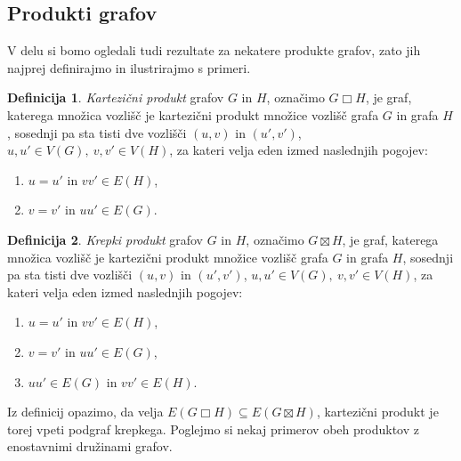 \documentclass[12pt,a4paper,twoside]{article}
\theoremstyle{definition} %
\newtheorem{definicija}{Definicija}[section]
\theoremstyle{plain} %
\numberwithin{equation}{section}  %
\DeclareMathOperator{\boxempty}{\Box}
\begin{document}
\subsection{Produkti grafov}
V delu si bomo ogledali tudi rezultate za nekatere produkte grafov, zato jih najprej definirajmo in ilustrirajmo s primeri.

\begin{definicija}
    \emph{Kartezični produkt} grafov $G$ in $H$, označimo $G \boxempty H$, je graf, katerega  množica vozlišč je kartezični produkt množice vozlišč grafa $G$ in grafa $H$, sosednji pa sta tisti dve vozlišči $(u, v)$ in $(u', v')$, $u, u' \in V(G),\ v, v' \in V(H)$, za kateri velja eden izmed naslednjih pogojev:
    \begin{enumerate}
        \item $u = u'$ in $vv' \in E(H)$,
        \item $v = v'$ in $uu' \in E(G)$.
    \end{enumerate}
\end{definicija}

\begin{definicija}
    \emph{Krepki produkt} grafov $G$ in $H$, označimo $G \boxtimes H$, je graf, katerega  množica vozlišč je kartezični produkt množice vozlišč grafa $G$ in grafa $H$, sosednji pa sta tisti dve vozlišči $(u, v)$ in $(u', v')$, $u, u' \in V(G),\ v, v' \in V(H)$, za kateri velja eden izmed naslednjih pogojev:
    \begin{enumerate}
        \item $u = u'$ in $vv' \in E(H)$,
        \item $v = v'$ in $uu' \in E(G)$,
        \item $uu' \in E(G)$ in $vv' \in E(H)$.
    \end{enumerate}
\end{definicija}

Iz definicij opazimo, da velja $E(G \boxempty H) \subseteq E(G \boxtimes H)$, kartezični produkt je torej vpeti podgraf krepkega. Poglejmo si  nekaj primerov obeh produktov z enostavnimi družinami grafov.
\end{document}
